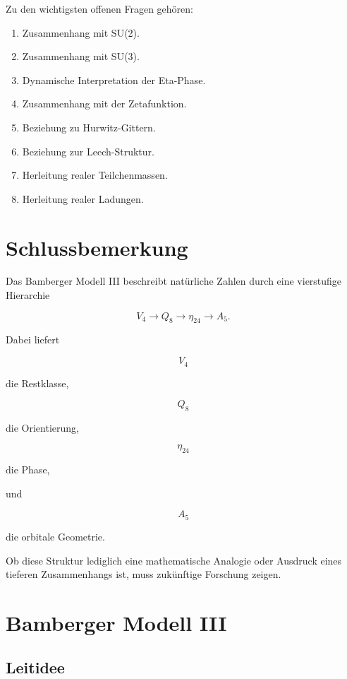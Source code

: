 \documentclass[11pt,a4paper]{article}
\theoremstyle{definition}
\theoremstyle{remark}
\begin{document}
	Zu den wichtigsten offenen Fragen gehören:
	
	\begin{enumerate}
		\item Zusammenhang mit SU(2).
		\item Zusammenhang mit SU(3).
		\item Dynamische Interpretation der Eta-Phase.
		\item Zusammenhang mit der Zetafunktion.
		\item Beziehung zu Hurwitz-Gittern.
		\item Beziehung zur Leech-Struktur.
		\item Herleitung realer Teilchenmassen.
		\item Herleitung realer Ladungen.
	\end{enumerate}
	
	
	\section{Schlussbemerkung}
	
	Das Bamberger Modell III beschreibt natürliche Zahlen
	durch eine vierstufige Hierarchie
	
	\[
	V_4
	\rightarrow
	Q_8
	\rightarrow
	\eta_{24}
	\rightarrow
	A_5.
	\]
	
	Dabei liefert
	
	\[
	V_4
	\]
	
	die Restklasse,
	
	\[
	Q_8
	\]
	
	die Orientierung,
	
	\[
	\eta_{24}
	\]
	
	die Phase,
	
	und
	
	\[
	A_5
	\]
	
	die orbitale Geometrie.
	
	Ob diese Struktur lediglich eine mathematische Analogie
	oder Ausdruck eines tieferen Zusammenhangs ist,
	muss zukünftige Forschung zeigen.
	
	\section{Bamberger Modell III}
	
	\subsection{Leitidee}
	
\end{document}
